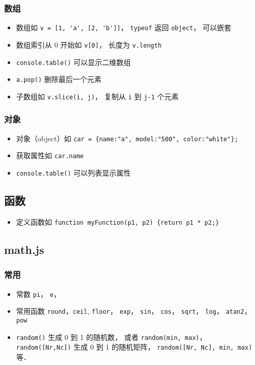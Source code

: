\subsubsection{数组}
\begin{itemize}
\item 数组如 \verb|v = [1, 'a', [2, 'b']]|， \verb|typeof| 返回 \verb|object|， 可以嵌套
\item 数组索引从 0 开始如 \verb|v[0]|， 长度为 \verb|v.length|
\item \verb|console.table()| 可以显示二维数组
\item \verb|a.pop()| 删除最后一个元素
\item 子数组如 \verb|v.slice(i, j)|， 复制从 \verb|i| 到 \verb|j-1| 个元素
\end{itemize}

\subsubsection{对象}
\begin{itemize}
\item 对象（object）如 \verb|car = {name:"a", model:"500", color:"white"};|
\item 获取属性如 \verb|car.name|
\item \verb|console.table()| 可以列表显示属性
\end{itemize}


\subsection{函数}
\begin{itemize}
\item 定义函数如 \verb|function myFunction(p1, p2) {return p1 * p2;}|
\end{itemize}


\subsection{math.js}
\subsubsection{常用}
\begin{itemize}
\item 常数 \verb|pi|， \verb|e|， 
\item 常用函数 \verb|round|，\verb|ceil|, \verb|floor|， \verb|exp|， \verb|sin|， \verb|cos|， \verb|sqrt|， \verb|log|， \verb|atan2|， \verb|pow|
\item \verb|random()| 生成 0 到 1 的随机数， 或者 \verb|random(min, max)|， \verb|random([Nr,Nc])| 生成 0 到 1 的随机矩阵， \verb|random([Nr, Nc], min, max)| 等．
\end{itemize}

